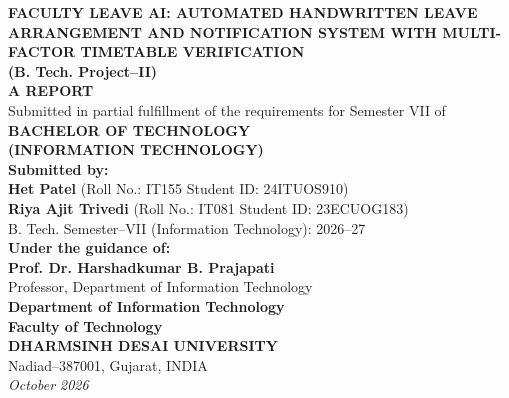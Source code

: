 \documentclass[12pt,letterpaper]{report}
\begin{document}
\begin{titlepage}
\begin{center}
    \vspace*{0.2cm}
    {\LARGE \textbf{\color{dduNavy} FACULTY LEAVE AI: AUTOMATED HANDWRITTEN LEAVE ARRANGEMENT AND NOTIFICATION SYSTEM WITH MULTI-FACTOR TIMETABLE VERIFICATION}}\\[0.8cm]
    {\Large \textbf{(B. Tech. Project--II)}}\\[1.0cm]
    {\large \textbf{A REPORT}}\\[0.6cm]
    {\normalsize Submitted in partial fulfillment of the requirements for Semester VII of}\\[0.2cm]
    {\large \textbf{BACHELOR OF TECHNOLOGY}}\\[0.2cm]
    {\large \textbf{(INFORMATION TECHNOLOGY)}}\\[1.0cm]
    
    {\normalsize \textbf{Submitted by:}}\\[0.3cm]
    {\large \textbf{Het Patel}} \quad (Roll No.: IT155 \quad Student ID: 24ITUOS910)\\[0.2cm]
    {\large \textbf{Riya Ajit Trivedi}} \quad (Roll No.: IT081 \quad Student ID: 23ECUOG183)\\[0.2cm]
    {\normalsize B. Tech. Semester--VII (Information Technology): 2026--27}\\[1.0cm]

    {\normalsize \textbf{Under the guidance of:}}\\[0.3cm]
    {\large \textbf{Prof. Dr. Harshadkumar B. Prajapati}}\\[0.1cm]
    {\normalsize Professor, Department of Information Technology}\\[1.2cm]

    {\large \textbf{Department of Information Technology}}\\[0.1cm]
    {\large \textbf{Faculty of Technology}}\\[0.1cm]
    {\Large \textbf{\color{dduNavy} DHARMSINH DESAI UNIVERSITY}}\\[0.1cm]
    {\normalsize Nadiad--387001, Gujarat, INDIA}\\[0.3cm]
    {\normalsize \textit{October 2026}}
\end{center}
\end{titlepage}
\end{document}
